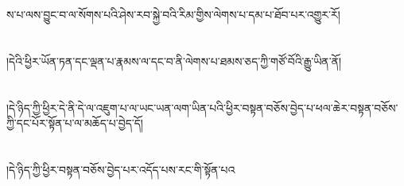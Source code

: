 ས་པ་ལས་བྱུང་བ་ལ་སོགས་པའི་ཤེས་རབ་སྐྱེ་བའི་རིམ་གྱིས་ལེགས་པ་དམ་པ་ཐོབ་པར་འགྱུར་རོ།\chapter{ }།དེའི་ཕྱིར་ཡོན་ཏན་དང་ལྡན་པ་རྣམས་ལ་དང་བ་ནི་ལེགས་པ་ཐམས་ཅད་ཀྱི་གཙོ་བོའི་རྒྱུ་ཡིན་ནོ།\chapter{ }།དེ་ཉིད་ཀྱི་ཕྱིར་དེ་ནི་དེ་ལ་འཇུག་པ་ལ་ཡང་ཡན་ལག་ཡིན་པའི་ཕྱིར་བསྟན་བཅོས་བྱེད་པ་ཕལ་ཆེར་བསྟན་བཅོས་ཀྱི་དང་པོར་སྟོན་པ་ལ་མཆོད་པ་བྱེད་དོ།\chapter{ }།དེ་ཉིད་ཀྱི་ཕྱིར་བསྟན་བཅོས་བྱེད་པར་འདོད་པས་རང་གི་སྟོན་པའ